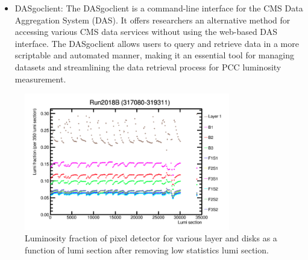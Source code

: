 \begin{itemize}
\item DASgoclient: The DASgoclient is a command-line interface for the CMS Data Aggregation System (DAS). It offers researchers an alternative method for accessing various CMS data services without using the web-based DAS interface. The DASgoclient allows users to query and retrieve data in a more scriptable and automated manner, making it an essential tool for managing datasets and streamlining the data retrieval process for PCC luminosity measurement.

\end{itemize}



\begin{figure}[!htp]
\centering
\includegraphics[width=0.8\textwidth]{ashish_thesis/pcc_stability_begin.png}
\caption{%
   Luminosity fraction of pixel detector for various layer and disks as a function of lumi section after removing low statistics lumi section.
}
\label{fig:PCC_stab_begin}
\end{figure}



